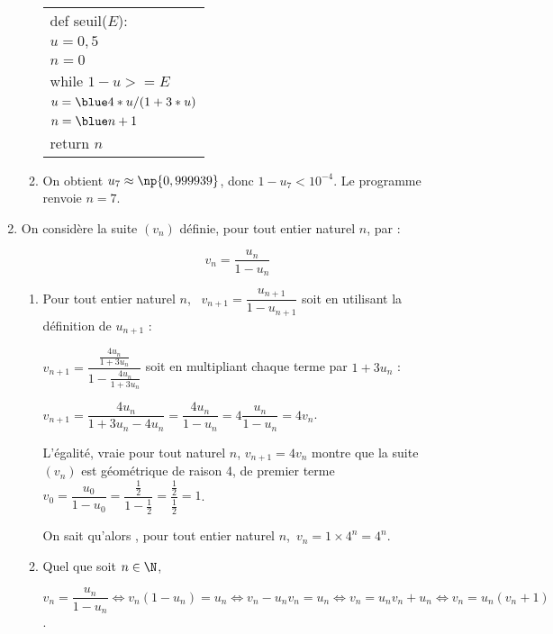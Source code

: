 \begin{enumerate}
\begin{enumerate}
\begin{center}
\begin{tabularx}{0.4\linewidth}{|X|}\hline
def seuil($E$):\\
\quad $u = 0,5$\\
\quad $n = 0$ \\
\quad  while $1 - u > = E$\\
\quad \quad $u = \blue 4*u/(1 + 3*u)$\\
\quad \quad $n = \blue n + 1$\\
\quad return $n$\\ \hline
\end{tabularx}
\end{center}
		\item %
On obtient $u_7 \approx \np{0,999939}$, donc $1 - u_7 < 10^{-4}$. Le programme renvoie $n = 7$.
	\end{enumerate}
\item On considère la suite $\left(v_n\right)$ définie, pour tout entier naturel $n$, par :

\[v_n  = \dfrac{u_n}{1 - u_n}\]

	\begin{enumerate}
		\item %

Pour tout entier naturel $n$, \, $v_{n+1}  = \dfrac{u_{n+1}}{1 - u_{n+1}}$ soit en utilisant la définition de $u_{n+1}$ :

$v_{n+1}  = \dfrac{\frac{4u_n}{1 + 3u_n}}{1 - \frac{4u_n}{1 + 3u_n}}$ soit en multipliant chaque terme par $1 + 3u_n$ :

$v_{n+1} = \dfrac{4u_n}{1 + 3u_n - 4u_n} = \dfrac{4u_n}{1 - u_n} = 4\dfrac{u_n}{1 - u_n} = 4v_n$.

L'égalité, vraie pour tout naturel $n$, $v_{n+1} = 4v_n$ montre que la suite $\left(v_n\right)$ est géométrique de raison 4, de premier terme $v_0 = \dfrac{u_0}{1 - u_0} = \dfrac{\frac{1}{2}}{1 - \frac{1}{2}} = \dfrac{\frac{1}{2}}{\frac{1}{2}} = 1$.
	
On sait qu'alors , pour tout entier naturel $n$,\, $v_n = 1 \times 4^n = 4^n$.
		\item %
Quel que soit $n \in \N$,

$v_n  = \dfrac{u_n}{1 - u_n}\iff v_n\left( 1 - u_n\right) = u_n \iff v_n - u_nv_n = u_n \iff v_n = u_nv_n + u_n \iff v_n = u_n\left(v_n + 1 \right)$.


\end{enumerate}
\end{enumerate}
